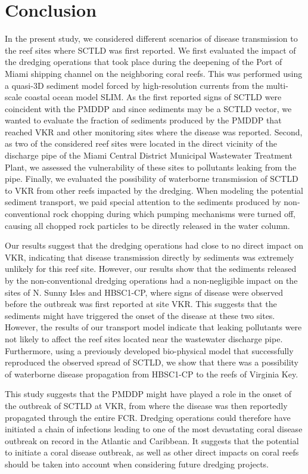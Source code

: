 \documentclass[preprint,12pt,authoryear]{elsarticle}
\begin{document}
\section{Conclusion}

In the present study, we considered different scenarios of disease transmission to the reef sites where SCTLD was first reported. We first evaluated the impact of the dredging operations that took place during the deepening of the Port of Miami shipping channel on the neighboring coral reefs. This was performed using a quasi-3D sediment model forced by high-resolution currents from the multi-scale coastal ocean model SLIM. As the first reported signs of SCTLD were coincident with the PMDDP and since sediments may be a SCTLD vector, we wanted to evaluate the fraction of sediments produced by the PMDDP that reached VKR and other monitoring sites where the disease was reported. Second, as two of the considered reef sites were located in the direct vicinity of the discharge pipe of the Miami Central District Municipal Wastewater Treatment Plant, we assessed the vulnerability of these sites to pollutants leaking from the pipe. Finally, we evaluated the possibility of waterborne transmission of SCTLD to VKR from other reefs impacted by the dredging. When modeling the potential sediment transport, we paid special attention to the sediments produced by non-conventional rock chopping during which pumping mechanisms were turned off, causing all chopped rock particles to be directly released in the water column.

Our results suggest that the dredging operations had close to no direct impact on VKR, indicating that disease transmission directly by sediments was extremely unlikely for this reef site. However, our results show that the sediments released by the non-conventional dredging operations had a non-negligible impact on the sites of N. Sunny Isles and HBSC1-CP, where signs of disease were observed before the outbreak was first reported at site VKR. This suggests that the sediments might have triggered the onset of the disease at these two sites. However, the results of our transport model indicate that leaking pollutants were not likely to affect the reef sites located near the wastewater discharge pipe. Furthermore, using a previously developed bio-physical model that successfully reproduced the observed spread of SCTLD, we show that there was a possibility of waterborne disease propagation from HBSC1-CP to the reefs of Virginia Key.

This study suggests that the PMDDP might have played a role in the onset of the outbreak of SCTLD at VKR, from where the disease was then reportedly propagated through the entire FCR. Dredging operations could therefore have initiated a chain of infections leading to one of the most devastating coral disease outbreak on record in the Atlantic and Caribbean. It suggests that the potential to initiate a coral disease outbreak, as well as other direct impacts on coral reefs should be taken into account when considering future dredging projects.
\end{document}
